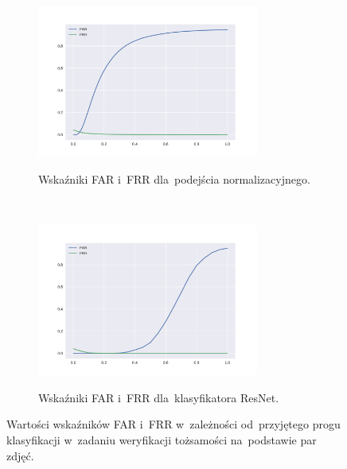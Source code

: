 \documentclass[11pt,a4paper]{article}
\begin{document}
\begin{figure}[H]
    \begin{subfigure}{\textwidth}
        \centering
        \includegraphics[width=0.8\textwidth]{res/img/normalized_error_rates.pdf}
        \label{subfig:normalized-error-rates}
        \caption{Wskaźniki FAR i~FRR dla~podejścia normalizacyjnego.}
    \end{subfigure}
    \\
    \begin{subfigure}{\textwidth}
        \centering
        \includegraphics[width=0.8\textwidth]{res/img/resnet_error_rates.pdf}
        \label{subfig:resnet-error-rates}
        \caption{Wskaźniki FAR i~FRR dla~klasyfikatora ResNet.}
    \end{subfigure}
    \caption{Wartości wskaźników FAR i~FRR w~zależności od~przyjętego progu klasyfikacji w~zadaniu weryfikacji tożsamości na~podstawie par zdjęć.}
\end{figure}
\end{document}
